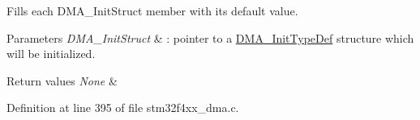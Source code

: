 Fills each D\+M\+A\+\_\+\+Init\+Struct member with its default value. 


\begin{DoxyParams}{Parameters}
{\em D\+M\+A\+\_\+\+Init\+Struct} & \+: pointer to a \hyperlink{struct_d_m_a___init_type_def}{D\+M\+A\+\_\+\+Init\+Type\+Def} structure which will be initialized. \\
\hline
\end{DoxyParams}

\begin{DoxyRetVals}{Return values}
{\em None} & \\
\hline
\end{DoxyRetVals}


Definition at line 395 of file stm32f4xx\+\_\+dma.\+c.


